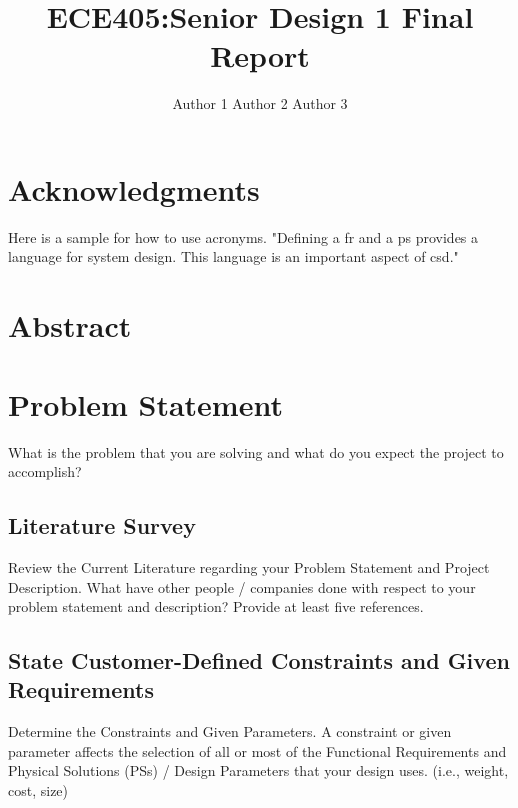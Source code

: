 \documentclass{ipfwpaper}
\author{Author 1\formatemail{Email 1} Author 2\formatemail{Email 2} Author 3\formatemail{Email 3}}
\title{ECE405:Senior Design 1 Final Report}
\begin{document}
 
\maketitle %




\startTable
{}
\AddRevision{}{}{}
\stopTable


\tableofcontents
\listoftables
\listoffigures
\printglossary[title=List of Acronyms ,type=\acronymtype]
\clearpage



\section*{Acknowledgments}


Here is a sample for how to use acronyms. "Defining a \gls{fr} and a \gls{ps} provides a language for system design. This language is an important aspect of \gls{csd}."


\section*{Abstract}


\section{Problem Statement}
What is the problem that you are solving and what do you expect the project to accomplish?

\subsection{Literature Survey}
Review the Current Literature regarding your Problem Statement and Project Description. 
What have other people / companies done with respect to your problem statement and description? Provide at least five references.


\subsection{State Customer-Defined Constraints and Given Requirements}
Determine the Constraints and Given Parameters.
A constraint or given parameter affects the selection of all or most of the Functional Requirements and Physical Solutions (PSs) / Design Parameters that your design uses. (i.e., weight, cost, size)
\end{document}

